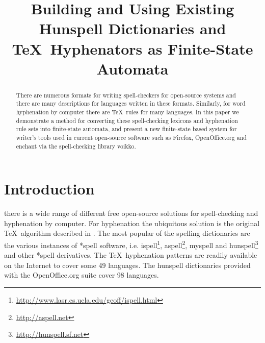 \documentclass[a4paper,conference]{IEEEtran}
\begin{document}
\title{Building and Using Existing Hunspell Dictionaries and \TeX\ Hyphenators
  as Finite-State Automata}

\author{
}

\maketitle

\begin{abstract}
  There are numerous formats for writing spell-checkers for
  open-source systems and there are many descriptions for languages
  written in these formats. Similarly, for word hyphenation by
  computer there are \TeX\ rules for many languages. In this paper we
  demonstrate a method for converting these spell-checking lexicons
  and hyphenation rule sets into finite-state automata, and present a
  new finite-state based system for writer's tools used in current
  open-source software such as Firefox, OpenOffice.org and enchant via
  the spell-checking library voikko.
\end{abstract}


\section{Introduction}
\label{sec:introduction}

 there is a wide range of different free open-source
solutions for spell-checking and hyphenation by computer. For
hyphenation the ubiquitous solution is the original \TeX\ algorithm
described in \cite{liang/1983}.  The most popular of the spelling
dictionaries are the various instances of *spell software, i.e.
ispell\footnote{\url{http://www.lasr.cs.ucla.edu/geoff/ispell.html}},
aspell\footnote{\url{http://aspell.net}}, myspell and
hunspell\footnote{\url{http://hunspell.sf.net}} and other *spell
derivatives.  The \TeX\ hyphenation patterns are readily available on
the Internet to cover some 49 languages. The hunspell dictionaries
provided with the OpenOffice.org suite cover 98 languages.
\end{document}
